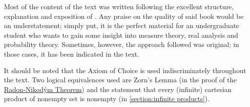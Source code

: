 Most of the content of the text was written following the excellent structure, explanation and exposition of \cite{ash1972real}. Any praise on the quality of said book would be an understatement; simply put, it is the perfect material for an undergraduate student who wants to gain some insight into measure theory, real analysis and probability theory. Sometimes, however, the approach followed was original; in those cases, it has been indicated in the text.

It should be noted that the Axiom of Choice is used indiscriminately throughout the text. Two logical equivalences used are Zorn's Lemma (in the proof of the \hyperref[theorem:Radon-Nikodym]{Radon-Nikodým Theorem}) and the statement that every (infinite) cartesian product of nonempty set is nonempty (in \cref{section:infinite products}).
